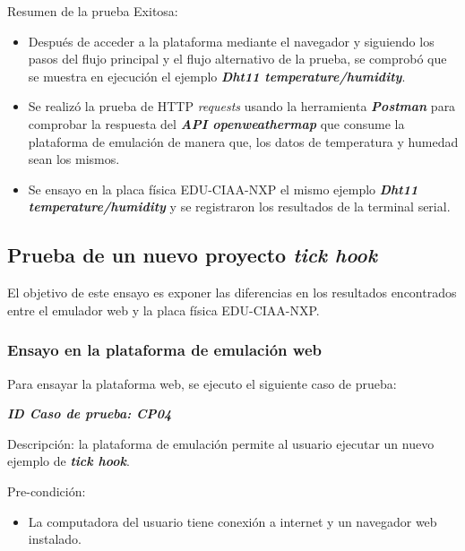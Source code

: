 Resumen de la prueba Exitosa:
\begin{itemize}
	\item Después de acceder a la plataforma mediante el navegador y siguiendo los pasos del flujo principal y el flujo alternativo de la prueba, se comprobó que se muestra en ejecución el ejemplo \textit{\textbf{Dht11 temperature/humidity}}.
	\item Se realizó la prueba de HTTP \textit{requests} usando la herramienta \textit{\textbf{Postman}} para comprobar la respuesta del \textit{\textbf{API openweathermap}} que consume la plataforma de emulación de manera que, los datos de temperatura y humedad sean los mismos.
	\item Se ensayo en la placa física EDU-CIAA-NXP  el mismo ejemplo \textit{\textbf{Dht11 temperature/humidity}} y se registraron los resultados de la terminal serial.

\end{itemize}


\subsection{ Prueba de un nuevo proyecto \textit{\textbf{tick hook}}}
El objetivo de este ensayo es exponer las diferencias en los resultados encontrados entre el emulador web y la placa física EDU-CIAA-NXP.

\subsubsection{Ensayo en la plataforma de emulación web} 
Para ensayar la plataforma web, se ejecuto el siguiente caso de prueba:

\textit{\textbf{ID Caso de prueba: CP04}}

Descripción: la plataforma de emulación permite al usuario ejecutar un nuevo ejemplo de \textit{\textbf{tick hook}}.

Pre-condición: 
\begin{itemize}
	\item La computadora del usuario tiene conexión a internet y un navegador web instalado.
\end{itemize}

